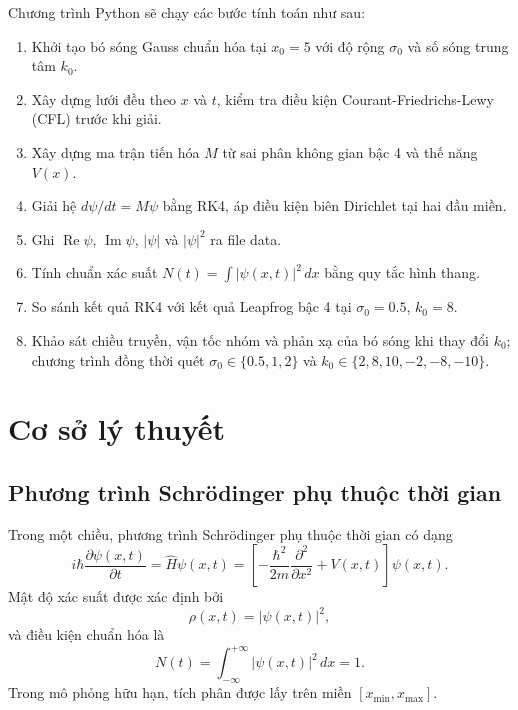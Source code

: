 \documentclass[12pt,a4paper]{article}
\begin{document}
Chương trình Python sẽ chạy các bước tính toán như sau:
\begin{enumerate}
    \item Khởi tạo bó sóng Gauss chuẩn hóa tại $x_0=5$ với độ rộng $\sigma_0$ và số sóng trung tâm $k_0$.
    \item Xây dựng lưới đều theo $x$ và $t$, kiểm tra điều kiện Courant-Friedrichs-Lewy (CFL) trước khi giải.
    \item Xây dựng ma trận tiến hóa $M$ từ sai phân không gian bậc 4 và thế năng $V(x)$.
    \item Giải hệ $d\psi/dt=M\psi$ bằng RK4, áp điều kiện biên Dirichlet tại hai đầu miền.
    \item Ghi $\operatorname{Re}\psi$, $\operatorname{Im}\psi$, $|\psi|$ và $|\psi|^2$ ra file data.
    \item Tính chuẩn xác suất $N(t)=\int |\psi(x,t)|^2\,dx$ bằng quy tắc hình thang.
    \item So sánh kết quả RK4 với kết quả Leapfrog bậc 4 tại $\sigma_0=0.5$, $k_0=8$.
    \item Khảo sát chiều truyền, vận tốc nhóm và phản xạ của bó sóng khi thay đổi $k_0$; chương trình đồng thời quét $\sigma_0\in\{0.5,1,2\}$ và $k_0\in\{2,8,10,-2,-8,-10\}$.
\end{enumerate}

\section{Cơ sở lý thuyết}

\subsection{Phương trình Schrödinger phụ thuộc thời gian}

Trong một chiều, phương trình Schrödinger phụ thuộc thời gian có dạng
\begin{equation}
    i\hbar\frac{\partial \psi(x,t)}{\partial t}
    = \hat H\psi(x,t)
    = \left[-\frac{\hbar^2}{2m}\frac{\partial^2}{\partial x^2}+V(x,t)\right]\psi(x,t).
    \label{eq:tdse}
\end{equation}
Mật độ xác suất được xác định bởi
\begin{equation}
    \rho(x,t)=|\psi(x,t)|^2,
\end{equation}
và điều kiện chuẩn hóa là
\begin{equation}
    N(t)=\int_{-\infty}^{+\infty}|\psi(x,t)|^2\,dx=1.
    \label{eq:norm}
\end{equation}
Trong mô phỏng hữu hạn, tích phân được lấy trên miền $[x_{\min},x_{\max}]$.
\end{document}
